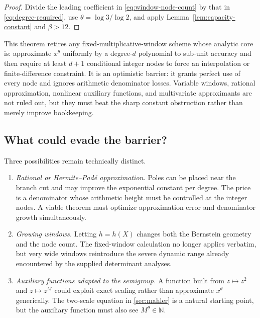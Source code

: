 \documentclass[11pt,oneside]{article}
\theoremstyle{definition}
\theoremstyle{remark}
\newcommand{\N}{\mathbb N}
\begin{document}
\begin{proof}
Divide the leading coefficient in \eqref{eq:window-node-count} by that in \eqref{eq:degree-required}, use $\theta=\log3/\log2$, and apply Lemma~\ref{lem:capacity-constant} and $\beta>12$.
\end{proof}

\begin{barrierbox}[Interpretation]
This theorem retires any fixed-multiplicative-window scheme whose analytic core is: approximate $x^\theta$ uniformly by a degree-$d$ polynomial to sub-unit accuracy and then require at least $d+1$ conditional integer nodes to force an interpolation or finite-difference constraint.  It is an optimistic barrier: it grants perfect use of every node and ignores arithmetic denominator losses.  Variable windows, rational approximation, nonlinear auxiliary functions, and multivariate approximants are not ruled out, but they must beat the sharp constant obstruction rather than merely improve bookkeeping.
\end{barrierbox}

\subsection{What could evade the barrier?}

Three possibilities remain technically distinct.
\begin{enumerate}
  \item \emph{Rational or Hermite--Pad\'e approximation.}  Poles can be placed near the branch cut and may improve the exponential constant per degree.  The price is a denominator whose arithmetic height must be controlled at the integer nodes.  A viable theorem must optimize approximation error and denominator growth simultaneously.
  \item \emph{Growing windows.}  Letting $h=h(X)$ changes both the Bernstein geometry and the node count.  The fixed-window calculation no longer applies verbatim, but very wide windows reintroduce the severe dynamic range already encountered by the supplied determinant analyses.
  \item \emph{Auxiliary functions adapted to the semigroup.}  A function built from $z\mapsto z^2$ and $z\mapsto z^M$ could exploit exact scaling rather than approximate $x^\theta$ generically.  The two-scale equation in \cref{sec:mahler} is a natural starting point, but the auxiliary function must also see $M^\theta\in\N$.
\end{enumerate}
\end{document}
